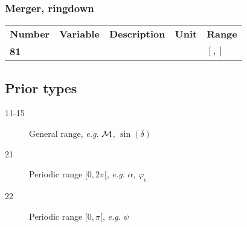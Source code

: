 \documentclass[11pt]{article}
\begin{document}
\subsubsection{Merger, ringdown}
\begin{tabular}{lllll}
  \textbf{Number} & \textbf{Variable} & \textbf{Description} & \textbf{Unit} & \textbf{Range} \\
  \textbf{81} &   & & & $[,]$ \\
\end{tabular}




\subsection{Prior types}
\begin{description}
  \item[11-15] General range, \textit{e.g.} $\cal{M}$, $\sin(\delta)$
  \item[21] Periodic range $[0,2\pi[$, \textit{e.g.} $\alpha$, $\varphi_\mathrm{c}$
  \item[22] Periodic range $[0,\pi[$, \textit{e.g.} $\psi$
\end{description}
\end{document}
